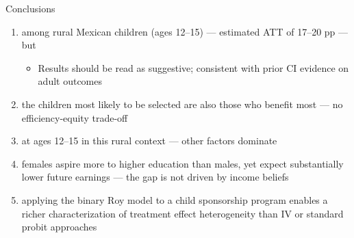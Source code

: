 \documentclass[aspectratio=169, 10pt]{beamer}
\begin{document}
\begin{frame}{Conclusions}
  \begin{enumerate}
    \item {} among rural Mexican children (ages 12--15) — estimated ATT of 17--20 pp — but 
    \begin{itemize}
      \item Results should be read as suggestive; consistent with prior CI evidence on adult outcomes
    \end{itemize}

    \item {} the children most likely to be selected are also those who benefit most — no efficiency-equity trade-off

    \item {} at ages 12--15 in this rural context — other factors dominate

    \item {} females aspire more to higher education than males, yet expect substantially lower future earnings — the gap is not driven by income beliefs

    \item {} applying the binary Roy model to a child sponsorship program enables a richer characterization of treatment effect heterogeneity than IV or standard probit approaches
  \end{enumerate}
\end{frame}
\end{document}
